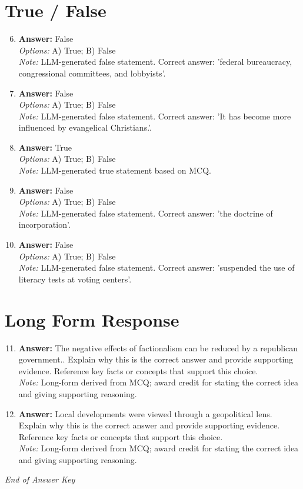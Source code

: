 \documentclass[12pt]{article}
\begin{document}
\section*{True / False}
\begin{enumerate}[label=\arabic*.]
\setcounter{enumi}{5}
\item \textbf{Answer:} False
\\ \textit{Options:} A) True; B) False
\\ \textit{Note:} LLM-generated false statement. Correct answer: 'federal bureaucracy, congressional committees, and lobbyists'.
\item \textbf{Answer:} False
\\ \textit{Options:} A) True; B) False
\\ \textit{Note:} LLM-generated false statement. Correct answer: 'It has become more influenced by evangelical Christians.'.
\item \textbf{Answer:} True
\\ \textit{Options:} A) True; B) False
\\ \textit{Note:} LLM-generated true statement based on MCQ.
\item \textbf{Answer:} False
\\ \textit{Options:} A) True; B) False
\\ \textit{Note:} LLM-generated false statement. Correct answer: 'the doctrine of incorporation'.
\item \textbf{Answer:} False
\\ \textit{Options:} A) True; B) False
\\ \textit{Note:} LLM-generated false statement. Correct answer: 'suspended the use of literacy tests at voting centers'.
\end{enumerate}

\section*{Long Form Response}
\begin{enumerate}[label=\arabic*.]
\setcounter{enumi}{10}
\item \textbf{Answer:} The negative effects of factionalism can be reduced by a republican government.. Explain why this is the correct answer and provide supporting evidence. Reference key facts or concepts that support this choice.
\\ \textit{Note:} Long-form derived from MCQ; award credit for stating the correct idea and giving supporting reasoning.
\item \textbf{Answer:} Local developments were viewed through a geopolitical lens. Explain why this is the correct answer and provide supporting evidence. Reference key facts or concepts that support this choice.
\\ \textit{Note:} Long-form derived from MCQ; award credit for stating the correct idea and giving supporting reasoning.
\end{enumerate}

\vfill
\noindent\textit{End of Answer Key}
\end{document}

